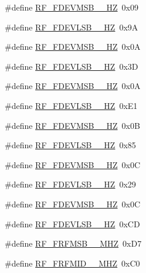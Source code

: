 \begin{DoxyCompactItemize}
\item 
\#define \mbox{\hyperlink{sx1276_regs-_fsk_8h_a7bb4105e24da2db3a56553eb96b85fee}{R\+F\+\_\+\+F\+D\+E\+V\+M\+S\+B\+\_\+\_\+\+HZ}}~0x09
\item 
\#define \mbox{\hyperlink{sx1276_regs-_fsk_8h_a71f7698b87a725be1779b76b935e6a6f}{R\+F\+\_\+\+F\+D\+E\+V\+L\+S\+B\+\_\+\_\+\+HZ}}~0x9A
\item 
\#define \mbox{\hyperlink{sx1276_regs-_fsk_8h_a968b4f3ec96d855980589e665504ed37}{R\+F\+\_\+\+F\+D\+E\+V\+M\+S\+B\+\_\+\_\+\+HZ}}~0x0A
\item 
\#define \mbox{\hyperlink{sx1276_regs-_fsk_8h_a39866c54593a2235f4420210b5b80603}{R\+F\+\_\+\+F\+D\+E\+V\+L\+S\+B\+\_\+\_\+\+HZ}}~0x3D
\item 
\#define \mbox{\hyperlink{sx1276_regs-_fsk_8h_a6b284d8f5090feebc648fdd533537e3c}{R\+F\+\_\+\+F\+D\+E\+V\+M\+S\+B\+\_\+\_\+\+HZ}}~0x0A
\item 
\#define \mbox{\hyperlink{sx1276_regs-_fsk_8h_a22d756238beb3bcd0a2a529f14a39ad5}{R\+F\+\_\+\+F\+D\+E\+V\+L\+S\+B\+\_\+\_\+\+HZ}}~0x\+E1
\item 
\#define \mbox{\hyperlink{sx1276_regs-_fsk_8h_a46b03842ce006837e2c6c45b445491d8}{R\+F\+\_\+\+F\+D\+E\+V\+M\+S\+B\+\_\+\_\+\+HZ}}~0x0B
\item 
\#define \mbox{\hyperlink{sx1276_regs-_fsk_8h_a1be73f0e78b52c082eeeaffe963f599a}{R\+F\+\_\+\+F\+D\+E\+V\+L\+S\+B\+\_\+\_\+\+HZ}}~0x85
\item 
\#define \mbox{\hyperlink{sx1276_regs-_fsk_8h_a630069f35932526b025935cdd3450410}{R\+F\+\_\+\+F\+D\+E\+V\+M\+S\+B\+\_\+\_\+\+HZ}}~0x0C
\item 
\#define \mbox{\hyperlink{sx1276_regs-_fsk_8h_a0053271b65e629e9cdaa5c3f345158d3}{R\+F\+\_\+\+F\+D\+E\+V\+L\+S\+B\+\_\+\_\+\+HZ}}~0x29
\item 
\#define \mbox{\hyperlink{sx1276_regs-_fsk_8h_ab1dad7f0e5a571acc531e431108a9fc9}{R\+F\+\_\+\+F\+D\+E\+V\+M\+S\+B\+\_\+\_\+\+HZ}}~0x0C
\item 
\#define \mbox{\hyperlink{sx1276_regs-_fsk_8h_a1f18878e3fdfb4aa5770666f80fe0cac}{R\+F\+\_\+\+F\+D\+E\+V\+L\+S\+B\+\_\+\_\+\+HZ}}~0x\+CD
\item 
\#define \mbox{\hyperlink{sx1276_regs-_fsk_8h_a7c04c2dc8d6dcc63877be6ab7e60376f}{R\+F\+\_\+\+F\+R\+F\+M\+S\+B\+\_\+\_\+\+M\+HZ}}~0x\+D7
\item 
\#define \mbox{\hyperlink{sx1276_regs-_fsk_8h_a5e338d308b8d245fcadd0c54b17f2164}{R\+F\+\_\+\+F\+R\+F\+M\+I\+D\+\_\+\_\+\+M\+HZ}}~0x\+C0

\end{DoxyCompactItemize}
